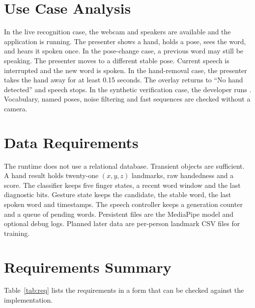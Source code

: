 \section{Use Case Analysis}
In the live recognition case, the webcam and speakers are available and the application is running. The presenter shows a hand, holds a pose, sees the word, and hears it spoken once. In the pose-change case, a previous word may still be speaking. The presenter moves to a different stable pose. Current speech is interrupted and the new word is spoken. In the hand-removal case, the presenter takes the hand away for at least 0.15 seconds. The overlay returns to ``No hand detected'' and speech stops. In the synthetic verification case, the developer runs . Vocabulary, named poses, noise filtering and fast sequences are checked without a camera.

\section{Data Requirements}
The runtime does not use a relational database. Transient objects are sufficient. A hand result holds twenty-one $(x,y,z)$ landmarks, raw handedness and a score. The classifier keeps five finger states, a recent word window and the last diagnostic bits. Gesture state keeps the candidate, the stable word, the last spoken word and timestamps. The speech controller keeps a generation counter and a queue of pending words. Persistent files are the MediaPipe model  and optional debug logs. Planned later data are per-person landmark CSV files for training.

\section{Requirements Summary}
Table~\ref{tab:req} lists the requirements in a form that can be checked against the implementation.

